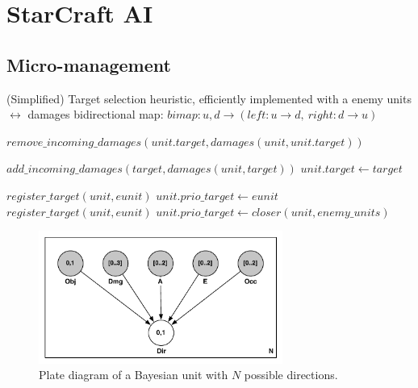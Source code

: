 \chapter{StarCraft AI}

\section{Micro-management}

\begin{algorithm}
\caption{(Simplified) Target selection heuristic, efficiently implemented with a enemy units $\leftrightarrow$ damages bidirectional map: $bimap : u, d \rightarrow (left : u \rightarrow d,\ right : d \rightarrow u)$}
\label{alg:targetselection}
\begin{algorithmic}
\State $remove\_incoming\_damages(unit.target, damages(unit,unit.target))$
\EndFunction

\State $add\_incoming\_damages(target, damages(unit, target))$
\State $unit.target \leftarrow target$
\EndFunction

            \State $register\_target(unit, eunit)$
            \State $unit.prio\_target \leftarrow eunit$
        \EndIf 
    \EndIf 
\EndFor
{}
            \State $register\_target(unit, eunit)$
        \EndIf 
    \EndFor
\EndIf
{} %
    $unit.prio\_target \leftarrow closer(unit, enemy\_units)$
\EndIf
\EndFunction
\end{algorithmic}
\end{algorithm}

\begin{figure}[!h]
\begin{center}
\includegraphics[width=8cm]{images/BayesianUnit_plate.pdf}
\caption{Plate diagram of a Bayesian unit with $N$ possible directions.}
\label{fig:BayesianUnit_plate}
\end{center}
\end{figure}

